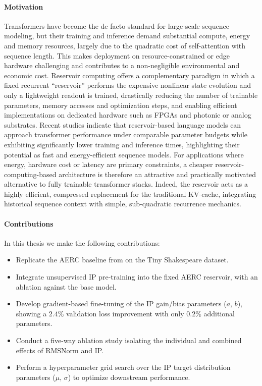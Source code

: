 \documentclass{sapthesis}
\begin{document}
\paragraph{Motivation}
Transformers have become the de facto standard for large-scale sequence modeling, but their training and inference demand substantial compute, energy and memory resources, largely due to the quadratic cost of self-attention with sequence length. This makes deployment on resource-constrained or edge hardware challenging and contributes to a non-negligible environmental and economic cost. Reservoir computing offers a complementary paradigm in which a fixed recurrent ``reservoir'' performs the expensive nonlinear state evolution and only a lightweight readout is trained, drastically reducing the number of trainable parameters, memory accesses and optimization steps, and enabling efficient implementations on dedicated hardware such as FPGAs and photonic or analog substrates. Recent studies indicate that reservoir-based language models can approach transformer performance under comparable parameter budgets while exhibiting significantly lower training and inference times, highlighting their potential as fast and energy-efficient sequence models. For applications where energy, hardware cost or latency are primary constraints, a cheaper reservoir-computing-based architecture is therefore an attractive and practically motivated alternative to fully trainable transformer stacks. Indeed, the reservoir acts as a highly efficient, compressed replacement for the traditional KV-cache, integrating historical sequence context with simple, sub-quadratic recurrence mechanics.

\paragraph{Contributions}
In this thesis we make the following contributions:
\begin{itemize}
  \item Replicate the AERC baseline from \cite{koster2024attentionenhancedreservoircomputing} on the Tiny Shakespeare dataset.
  \item Integrate unsupervised IP pre-training into the fixed AERC reservoir, with an ablation against the base model.
  \item Develop gradient-based fine-tuning of the IP gain/bias parameters ($a$, $b$), showing a $2.4\%$ validation loss improvement with only $0.2\%$ additional parameters.
  \item Conduct a five-way ablation study isolating the individual and combined effects of RMSNorm and IP.
  \item Perform a hyperparameter grid search over the IP target distribution parameters ($\mu$, $\sigma$) to optimize downstream performance.
\end{itemize}
\end{document}
